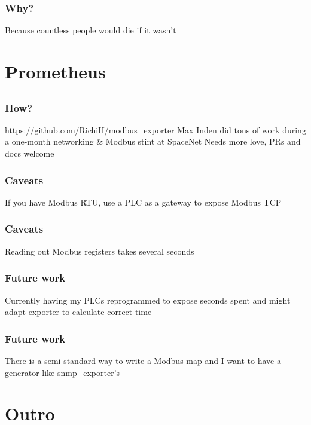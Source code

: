 \documentclass[aspectratio=169]{beamer}
\begin{document}
\begin{frame}
	\frametitle{Why?}
	\centering
	\vfill
	Because countless people would die if it wasn't
	\vfill
\end{frame}



\section{Prometheus}


\subsection{}

\begin{frame}
	\frametitle{How?}
	\centering
	\vfill
	\url{https://github.com/RichiH/modbus\_exporter}
	\vfill
	Max Inden did tons of work during a one-month networking \& Modbus stint at SpaceNet
	\vfill
	Needs more love, PRs and docs welcome
	\vfill
\end{frame}

\begin{frame}
	\frametitle{Caveats}
	\centering
	\vfill
	If you have Modbus RTU, use a PLC as a gateway to expose Modbus TCP
	\vfill
\end{frame}

\begin{frame}
	\frametitle{Caveats}
	\centering
	\vfill
	Reading out Modbus registers takes several seconds
	\vfill
\end{frame}

\begin{frame}
	\frametitle{Future work}
	\centering
	\vfill
	Currently having my PLCs reprogrammed to expose seconds spent and might adapt exporter to calculate correct time
	\vfill
\end{frame}

\begin{frame}
	\frametitle{Future work}
	\centering
	\vfill
	There is a semi-standard way to write a Modbus map and I want to have a generator like snmp\_exporter's
	\vfill
\end{frame}



\section{Outro}


\subsection{}
\end{document}
